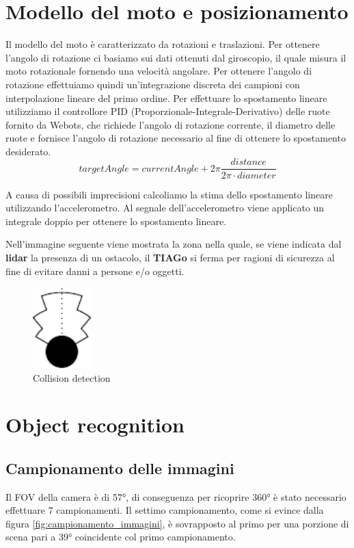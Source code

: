 \documentclass[a4paper]{article}
\begin{document}
	\section{Modello del moto e posizionamento}\label{sec:Modello-del-moto-e-posizionamento}
	Il modello del moto è caratterizzato da rotazioni e traslazioni. Per ottenere l'angolo di rotazione ci basiamo sui dati ottenuti dal giroscopio, il quale misura il moto rotazionale fornendo una velocità angolare. Per ottenere l'angolo di rotazione effettuiamo quindi un'integrazione discreta dei campioni con interpolazione lineare del primo ordine.
	Per effettuare lo spostamento lineare utilizziamo il controllore PID (Proporzionale-Integrale-Derivativo) delle ruote fornito da Webots, che richiede l'angolo di rotazione corrente, il diametro delle ruote e fornisce l'angolo di rotazione necessario al fine di ottenere lo spostamento desiderato.
	\begin{equation}\label{eq:odometry}
	targetAngle =
	currentAngle+2\pi\frac    {distance}
	{2\pi \cdot diameter}
	\end{equation}
	
	A causa di possibili imprecisioni calcoliamo la stima dello spostamento lineare utilizzando l'accelerometro. Al segnale dell'accelerometro viene applicato un integrale doppio per ottenere lo spostamento lineare.
	
	Nell'immagine seguente viene mostrata la zona nella quale, se viene indicata dal \textbf{lidar} la presenza di un ostacolo, il \textbf{TIAGo} si ferma per ragioni di sicurezza al fine di evitare danni a persone e/o oggetti.
	\begin{figure}[H]
		\centering
		\includegraphics[width=0.2\textwidth]{./img/collision_detection.pdf}
		\caption{Collision detection}
		\label{fig:collision_detection}
	\end{figure}
	
	\section{Object recognition}\label{sec:Object-recognition}
	
	\subsection{Campionamento delle immagini}\label{subsec:Campionamento-delle-immagini}
	Il FOV della camera è di 57°, di conseguenza per ricoprire 360° è stato necessario effettuare 7 campionamenti. Il settimo campionamento, come si evince dalla figura \ref{fig:campionamento_immagini}, è sovrapposto al primo per una porzione di scena pari a 39° coincidente col primo campionamento.
	
\end{document}

